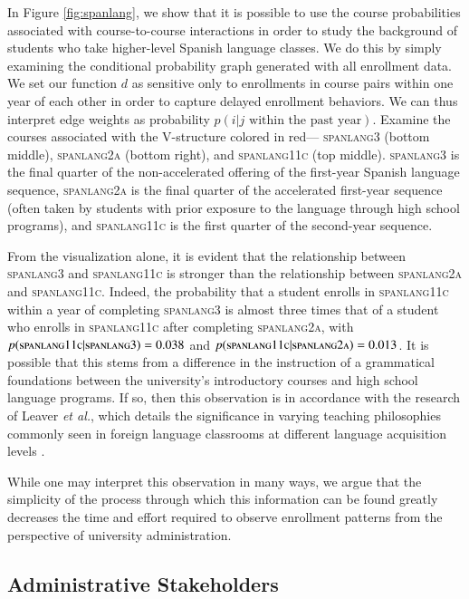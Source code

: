 \documentclass{sigchi}
\begin{document}
In Figure \ref{fig:spanlang}, we show that it is possible to use the course probabilities associated with course-to-course interactions in order to study the background of students who take higher-level Spanish language classes. We do this by simply examining the conditional probability graph generated with all enrollment data. We set our function $d$ as sensitive only to enrollments in course pairs within one year of each other in order to capture delayed enrollment behaviors. We can thus interpret edge weights as probability $p(i|j \text{ within the past year})$. Examine the courses associated with the V-structure colored in red--- \textsc{spanlang3} (bottom middle), \textsc{spanlang2a} (bottom right), and \textsc{spanlang11c} (top middle). \textsc{spanlang3} is the final quarter of the non-accelerated offering of the first-year Spanish language sequence, \textsc{spanlang2a} is the final quarter of the accelerated first-year sequence (often taken by students with prior exposure to the language through high school programs), and \textsc{spanlang11c} is the first quarter of the second-year sequence.

From the visualization alone, it is evident that the relationship between \textsc{spanlang3} and \textsc{spanlang11c} is stronger than the relationship between \textsc{spanlang2a} and \textsc{spanlang11c}. Indeed, the probability that a student enrolls in \textsc{spanlang11c} within a year of completing \textsc{spanlang3} is almost three times that of a student who enrolls in \textsc{spanlang11c} after completing \textsc{spanlang2a}, with $p(\textsc{spanlang11c}|\textsc{spanlang3}) = 0.038$ and $p(\textsc{spanlang11c}|\textsc{spanlang2a}) = 0.013$. It is possible that this stems from a difference in the instruction of a grammatical foundations between the university's introductory courses and high school language programs. If so, then this observation is in accordance with the research of Leaver \textit{et al.}, which details the significance in varying teaching philosophies commonly seen in foreign language classrooms at different language acquisition levels \cite{Leaver2002}.

While one may interpret this observation in many ways, we argue that the simplicity of the process through which this information can be found greatly decreases the time and effort required to observe enrollment patterns from the perspective of university administration.

\subsection{Administrative Stakeholders}
\label{sec:administrative_stakeholders}
\end{document}

